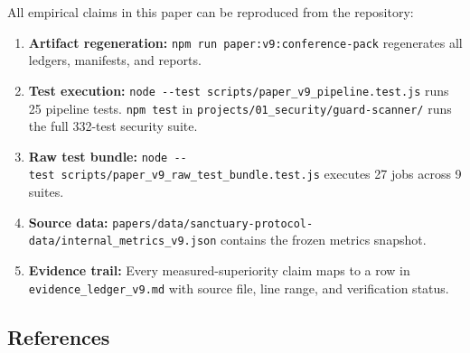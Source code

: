 \documentclass[
]{article}
\providecommand{\tightlist}{%
  \setlength{\itemsep}{0pt}\setlength{\parskip}{0pt}}
\begin{document}
All empirical claims in this paper can be reproduced from the repository:

\begin{enumerate}
\def\labelenumi{\arabic{enumi}.}
\tightlist
\item
  \textbf{Artifact regeneration:} \texttt{npm\ run\ paper:v9:conference-pack} regenerates all ledgers, manifests, and reports.
\item
  \textbf{Test execution:} \texttt{node\ -\/-test\ scripts/paper\_v9\_pipeline.test.js} runs 25 pipeline tests. \texttt{npm\ test} in \texttt{projects/01\_security/guard-scanner/} runs the full 332-test security suite.
\item
  \textbf{Raw test bundle:} \texttt{node\ -\/-test\ scripts/paper\_v9\_raw\_test\_bundle.test.js} executes 27 jobs across 9 suites.
\item
  \textbf{Source data:} \texttt{papers/data/sanctuary-protocol-data/internal\_metrics\_v9.json} contains the frozen metrics snapshot.
\item
  \textbf{Evidence trail:} Every measured-superiority claim maps to a row in \texttt{evidence\_ledger\_v9.md} with source file, line range, and verification status.
\end{enumerate}

\subsection{References}\label{references}
\end{document}
